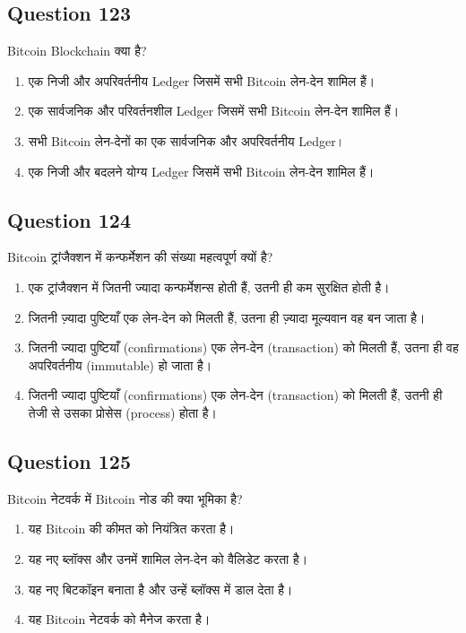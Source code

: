 \documentclass[12pt,a4paper]{article}
\begin{document}
\bigskip


\subsection*{Question 123}
Bitcoin Blockchain क्या है?

\begin{enumerate}[label=\Alph*., leftmargin=*]
\item एक निजी और अपरिवर्तनीय Ledger जिसमें सभी Bitcoin लेन-देन शामिल हैं।
\item एक सार्वजनिक और परिवर्तनशील Ledger जिसमें सभी Bitcoin लेन-देन शामिल हैं।
\item सभी Bitcoin लेन-देनों का एक सार्वजनिक और अपरिवर्तनीय Ledger।
\item एक निजी और बदलने योग्य Ledger जिसमें सभी Bitcoin लेन-देन शामिल हैं।
\end{enumerate}

\bigskip


\subsection*{Question 124}
Bitcoin ट्रांजैक्शन में कन्फर्मेशन की संख्या महत्वपूर्ण क्यों है?

\begin{enumerate}[label=\Alph*., leftmargin=*]
\item एक ट्रांजैक्शन में जितनी ज्यादा कन्फर्मेशन्स होती हैं, उतनी ही कम सुरक्षित होती है।
\item जितनी ज़्यादा पुष्टियाँ एक लेन-देन को मिलती हैं, उतना ही ज़्यादा मूल्यवान वह बन जाता है।
\item जितनी ज्यादा पुष्टियाँ (confirmations) एक लेन-देन (transaction) को मिलती हैं, उतना ही वह अपरिवर्तनीय (immutable) हो जाता है।
\item जितनी ज्यादा पुष्टियाँ (confirmations) एक लेन-देन (transaction) को मिलती हैं, उतनी ही तेजी से उसका प्रोसेस (process) होता है।
\end{enumerate}

\bigskip


\subsection*{Question 125}
Bitcoin नेटवर्क में Bitcoin नोड की क्या भूमिका है?

\begin{enumerate}[label=\Alph*., leftmargin=*]
\item यह Bitcoin की कीमत को नियंत्रित करता है।
\item यह नए ब्लॉक्स और उनमें शामिल लेन-देन को वैलिडेट करता है।
\item यह नए बिटकॉइन बनाता है और उन्हें ब्लॉक्स में डाल देता है।
\item यह Bitcoin नेटवर्क को मैनेज करता है।
\end{enumerate}
\end{document}
